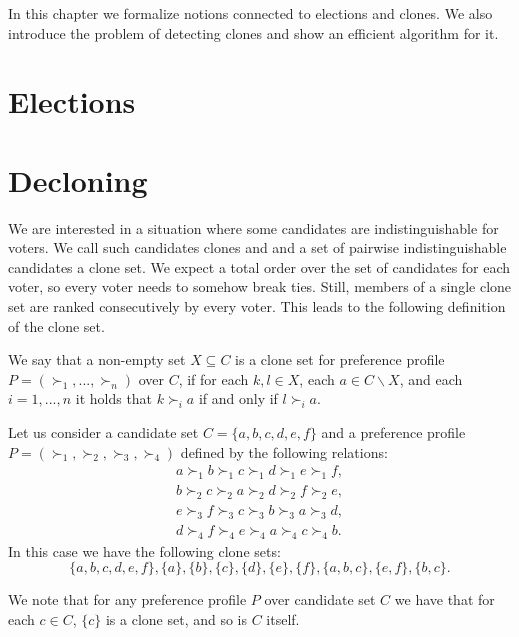 In this chapter we formalize notions connected to elections and clones.
We also introduce the problem of detecting clones and show an efficient algorithm for it.

\section{Elections} 

\section{Decloning}

We are interested in a situation where some candidates are indistinguishable for voters.
We call such candidates clones and and a set of pairwise indistinguishable candidates a clone set.
We expect a total order over the set of candidates for each voter,
so every voter needs to somehow break ties.
Still, members of a single clone set are ranked consecutively by every voter.
This leads to the following definition of the clone set.

\begin{defn}
We say that a non-empty set $X \subseteq C$ is a clone set
for preference profile $P = (\succ_1, ... , \succ_n)$ over $C$,
if for each $k,l \in X$, each $a \in C \backslash X$, and each $i=1, ..., n$ it holds that
$k \succ_i a$ if and only if $l \succ_i a$.
\end{defn}

\begin{exmp} \label{clone-sets}
Let us consider a candidate set $C = \{a,b,c,d,e,f\}$
and a preference profile $P = (\succ_1, \succ_2, \succ_3, \succ_4)$ defined by the following relations:
\begin{align*}
a \succ_1 b \succ_1 c \succ_1 d \succ_1 e \succ_1 f, \\
b \succ_2 c \succ_2 a \succ_2 d \succ_2 f \succ_2 e, \\
e \succ_3 f \succ_3 c \succ_3 b \succ_3 a \succ_3 d, \\
d \succ_4 f \succ_4 e \succ_4 a \succ_4 c \succ_4 b.
\end{align*}
In this case we have the following clone sets:
$$\{a,b,c,d,e,f\}, \{a\}, \{b\}, \{c\}, \{d\}, \{e\}, \{f\}, \{a,b,c\}, \{e,f\}, \{b,c\}.$$
\end{exmp}

\begin{rmrk}
We note that for any preference profile $P$ over candidate set $C$
we have that for each $c \in C$, $\{c\}$ is a clone set, and so is $C$ itself.
\end{rmrk}

